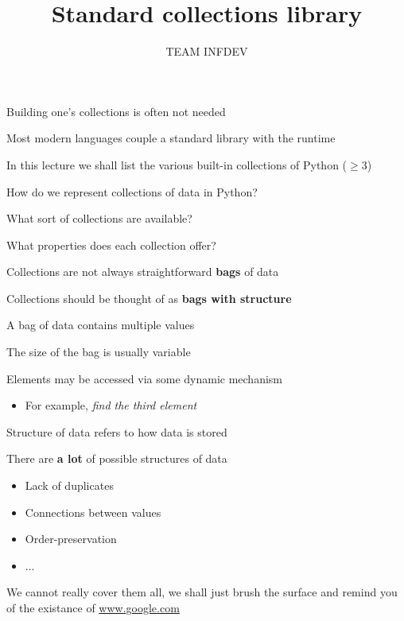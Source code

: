 \documentclass{beamer}
\title{Standard collections library}
\author{TEAM INFDEV}
\institute{Hogeschool Rotterdam \\ 
Rotterdam, Netherlands}
\date{}
\begin{document}
\maketitle

\begin{slide}{
\item Building one's collections is often not needed
\item Most modern languages couple a standard library with the runtime
\item In this lecture we shall list the various built-in collections of Python ($\geq 3$)
}\end{slide}

\begin{slide}{
\item How do we represent collections of data in Python?
\item What sort of collections are available?
\item What properties does each collection offer?
}\end{slide}

\begin{slide}{
\item Collections are not always straightforward \textbf{bags} of data
\item Collections should be thought of as \textbf{bags with structure}
}\end{slide}

\begin{slide}{
\item A bag of data contains multiple values
\item The size of the bag is usually variable
\item Elements may be accessed via some dynamic mechanism
\begin{itemize}
\item For example, \textit{find the third element}
\end{itemize}
}\end{slide}

\begin{slide}{
\item Structure of data refers to how data is stored
\item There are \textbf{a lot} of possible structures of data
\begin{itemize}
\item Lack of duplicates
\item Connections between values
\item Order-preservation
\item ...
\end{itemize}
\item We cannot really cover them all, we shall just brush the surface and remind you of the existance of \url{www.google.com}
}\end{slide}
\end{document}

